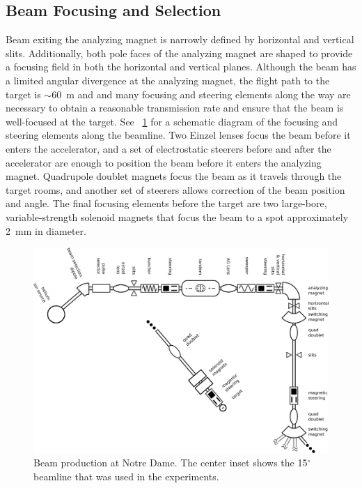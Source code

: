 \subsection{Beam Focusing and Selection}

Beam exiting the analyzing magnet is narrowly defined by horizontal and vertical slits.  Additionally, both pole faces of the analyzing magnet are shaped to provide a focusing field in both the horizontal and vertical planes.  Although the beam has a limited angular divergence at the analyzing magnet, the flight path to the target is $\sim60$~m and and many focusing and steering elements along the way are necessary to obtain a reasonable transmission rate and ensure that the beam is well-focused at the target.  See {\fig}~\ref{fig:beamline} for a schematic diagram of the focusing and steering elements along the beamline.  Two Einzel lenses \citep{BeamOptics} focus the beam before it enters the accelerator, and a set of electrostatic steerers before and after the accelerator are enough to position the beam before it enters the analyzing magnet.  Quadrupole doublet magnets focus the beam as it travels through the target rooms, and another set of steerers allows correction of the beam position and angle.  The final focusing elements before the target are two large-bore, variable-strength solenoid magnets \citep{TwinSol} that focus the beam to a spot approximately 2~mm in diameter.

\begin{figure}[htp]
\centering
\includegraphics[width=1.0\textwidth]{figures/NSL_beamline.eps}
\caption[Beam production at Notre Dame.]{Beam production at Notre Dame.  The center inset shows the 15$^{\circ}$ beamline that was used in the experiments.}
\label{fig:beamline}
\end{figure}

